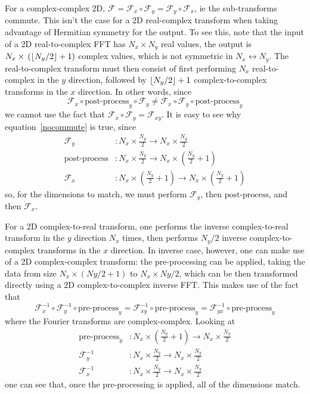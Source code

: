 \documentclass[12pt]{article}
\DeclarePairedDelimiter\floor{\lfloor}{\rfloor}
\newcommand{\Four}{\mathcal{F}}
\renewcommand{\(}{\left(}
\renewcommand{\)}{\right)}
\begin{document}
For a complex-complex 2D,
$\Four=\Four_x\circ\Four_y=\Four_y\circ\Four_x$, ie the sub-transforms
commute.  This isn't the case for a 2D real-complex transform when
taking advantage of Hermitian symmetry for the output.  To see this,
note that the input of a 2D real-to-complex FFT has $N_x\times{}N_y$
real values, the output is $N_x\times{}\(\floor{N_y/2} + 1\)$ complex
values, which is not symmetric in $N_x\leftrightarrow{}N_y$.  The
real-to-complex transform must then consist of first performing $N_x$
real-to-complex in the $y$ direction, followed by $\floor{N_y/2} + 1$
complex-to-complex transforms in the $x$ direction.
In other words, since
\begin{dmath}\label{nocommute}
  \Four_{x}\circ\text{post-process}_y\circ\Four_{y}
  \neq
  \Four_{x}\circ\Four_{y}\circ\text{post-process}_y
\end{dmath}
we cannot use the fact that $\Four_{x}\circ\Four_{y} = \Four_{xy}$.
It is easy to see why equation~\eqref{nocommute} is true, since
\begin{align}
  \Four_{y}
  &: N_x\times\frac{N_y}{2}\rightarrow N_x\times \frac{N_y}{2}\\
  \text{post-process}
  &: N_x\times\frac{N_y}{2}\rightarrow N_x\times \(\frac{N_y}{2}+1\)\\
  \Four_{x}
  &: N_x\times\(\frac{N_y}{2}+1\)\rightarrow N_x\times \(\frac{N_y}{2} +1\)
\end{align}
so, for the dimensions to match, we must perform $\Four_{y}$, then
$\text{post-process}$, and then $\Four_{x}$.

For a 2D complex-to-real transform, one performs the inverse
complex-to-real transform in the $y$ direction $N_x$ times, then
performs $N_y/2$ inverse complex-to-complex transforms in the $x$
direction.  In inverse case, however, one can make use of a 2D
complex-complex transform: the pre-processing can be applied, taking
the data from size $N_x\times{}\(Ny/2+1\)$ to $N_x\times{}Ny/2$, which
can be then transformed directly using a 2D complex-to-complex inverse
FFT.  This makes use of the fact that
\begin{dmath}
  \Four_{x}^{-1}  \circ  \Four_{y}^{-1} \circ \text{pre-process}_y
  = \Four_{xy}^{-1}\circ\text{pre-process}_y
  = \Four_{yx}^{-1}\circ\text{pre-process}_y
\end{dmath}
where the Fourier transforms are complex-complex.  Looking at
\begin{align}
  \text{pre-process}_y
  &: N_x\times\(\frac{N_y}{2}+1\)\rightarrow N_x\times \frac{N_y}{2}\\
  \Four_{y}^{-1}
  &: N_x\times\frac{N_y}{2}\rightarrow N_x\times \frac{N_y}{2}\\
  \Four_{x}^{-1}
  &: N_x\times\frac{N_y}{2}\rightarrow N_x\times \frac{N_y}{2}
\end{align}
one can see that, once the pre-processing is applied, all of the
dimensions match.
\end{document}
